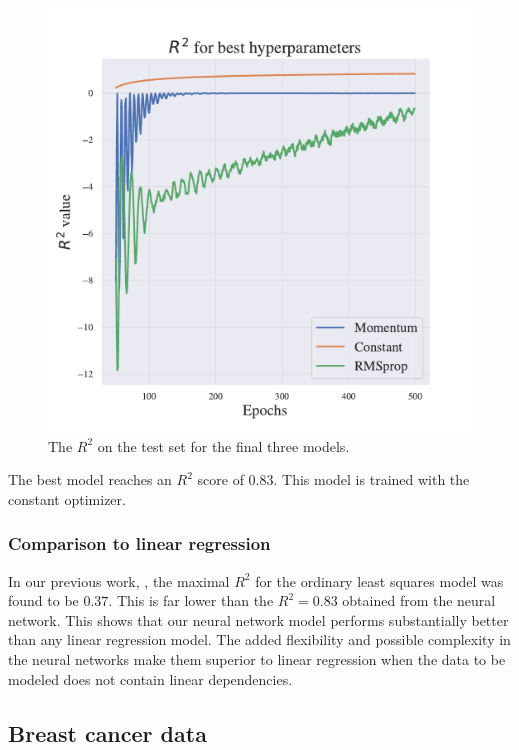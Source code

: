 \begin{figure}[h!]
    \centering
    \includegraphics[width=1.0\linewidth]{project_2/figures/best_continuous.pdf}
    \caption{The $R^2$ on the test set for the final three models.}
    \label{fig:best_franke}
\end{figure}

The best model reaches an $R^2$ score of $0.83$. This model is trained with the constant optimizer. 

\subsubsection{Comparison to linear regression}


In our previous work, \textcite{project1}, the maximal $R^2$ for the ordinary least squares model was found to be $0.37$. 
This is far lower than the $R^2 = 0.83$ obtained from the neural network.
This shows that our neural network model performs substantially better than any linear regression model.
The added flexibility and possible complexity in the neural networks make them superior to linear regression when the data to be modeled does not contain linear dependencies.

\subsection{Breast cancer data}

